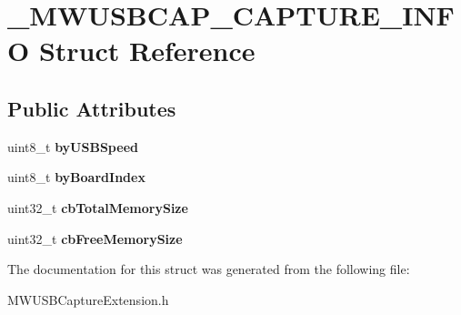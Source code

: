 \hypertarget{struct__MWUSBCAP__CAPTURE__INFO}{\section{\-\_\-\-M\-W\-U\-S\-B\-C\-A\-P\-\_\-\-C\-A\-P\-T\-U\-R\-E\-\_\-\-I\-N\-F\-O Struct Reference}
\label{struct__MWUSBCAP__CAPTURE__INFO}
}
\subsection*{Public Attributes}
\begin{DoxyCompactItemize}
\item 
\hypertarget{struct__MWUSBCAP__CAPTURE__INFO_ac0dcbc122cc6fb0370abddeb62ea6f84}{uint8\-\_\-t {\bfseries by\-U\-S\-B\-Speed}}\label{struct__MWUSBCAP__CAPTURE__INFO_ac0dcbc122cc6fb0370abddeb62ea6f84}

\item 
\hypertarget{struct__MWUSBCAP__CAPTURE__INFO_ac3a21c85c6d06ebf9e31681736e820c5}{uint8\-\_\-t {\bfseries by\-Board\-Index}}\label{struct__MWUSBCAP__CAPTURE__INFO_ac3a21c85c6d06ebf9e31681736e820c5}

\item 
\hypertarget{struct__MWUSBCAP__CAPTURE__INFO_aa4698b61612c347bbf925ee2bf2f1908}{uint32\-\_\-t {\bfseries cb\-Total\-Memory\-Size}}\label{struct__MWUSBCAP__CAPTURE__INFO_aa4698b61612c347bbf925ee2bf2f1908}

\item 
\hypertarget{struct__MWUSBCAP__CAPTURE__INFO_a95ec91fe0f02395ed35ff1d95226754e}{uint32\-\_\-t {\bfseries cb\-Free\-Memory\-Size}}\label{struct__MWUSBCAP__CAPTURE__INFO_a95ec91fe0f02395ed35ff1d95226754e}

\end{DoxyCompactItemize}


The documentation for this struct was generated from the following file\-:\begin{DoxyCompactItemize}
\item 
M\-W\-U\-S\-B\-Capture\-Extension.\-h\end{DoxyCompactItemize}
